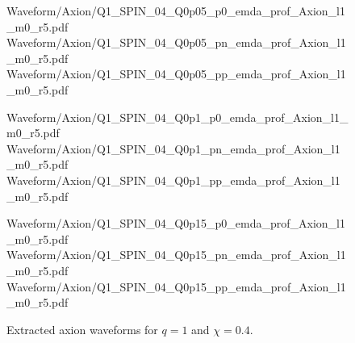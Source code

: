 \begin{figure}[p]
\centering

{Waveform/Axion/Q1_SPIN_04_Q0p05_p0_emda_prof_Axion_l1_m0_r5.pdf}
\hfill
{}
{Waveform/Axion/Q1_SPIN_04_Q0p05_pn_emda_prof_Axion_l1_m0_r5.pdf}
\hfill
{}
{Waveform/Axion/Q1_SPIN_04_Q0p05_pp_emda_prof_Axion_l1_m0_r5.pdf}

\vspace{0.6em}

{Waveform/Axion/Q1_SPIN_04_Q0p1_p0_emda_prof_Axion_l1_m0_r5.pdf}
\hfill
{}
{Waveform/Axion/Q1_SPIN_04_Q0p1_pn_emda_prof_Axion_l1_m0_r5.pdf}
\hfill
{}
{Waveform/Axion/Q1_SPIN_04_Q0p1_pp_emda_prof_Axion_l1_m0_r5.pdf}

\vspace{0.6em}

{Waveform/Axion/Q1_SPIN_04_Q0p15_p0_emda_prof_Axion_l1_m0_r5.pdf}
\hfill
{}
{Waveform/Axion/Q1_SPIN_04_Q0p15_pn_emda_prof_Axion_l1_m0_r5.pdf}
\hfill
{}
{Waveform/Axion/Q1_SPIN_04_Q0p15_pp_emda_prof_Axion_l1_m0_r5.pdf}

\caption{Extracted axion waveforms for $q=1$ and $\chi=0.4$.}
\label{fig:axion_catalog_q1_chi04}
\end{figure}

